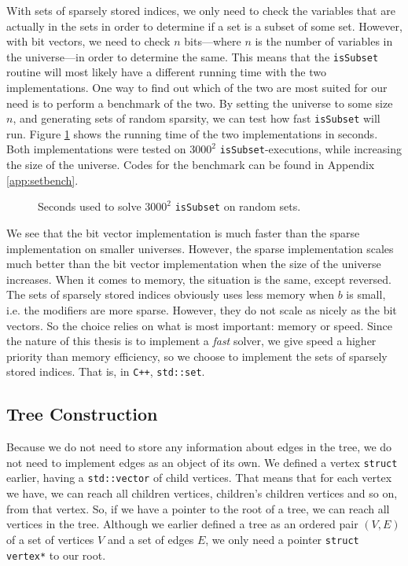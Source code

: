 With sets of sparsely stored indices, we only need to check the variables
that are actually in the sets in order to determine if a set is a subset
of some set. However, with bit vectors, we need to check $n$ bits---where $n$
is the number of variables in the universe---in order to determine the same.
This means that the \texttt{isSubset} routine will most likely have a different
running time with the two implementations. One way to find out which of the two
are most suited for our need is to perform a benchmark of the two. By
setting the universe to some size $n$, and generating sets of random sparsity,
we can test how fast \texttt{isSubset} will run. Figure \ref{fig:setspeed}
shows the running time of the two implementations in seconds. Both
implementations were tested on $3000^2$ \texttt{isSubset}-executions, while
increasing the size of the universe.
Codes for the benchmark can be found in Appendix \ref{app:setbench}.
\begin{figure}[h!]
\begin{center}

\end{center}
\caption{Seconds used to solve $3000^2$ \texttt{isSubset} on random sets.}
\label{fig:setspeed}
\end{figure}
We see that the bit vector implementation is much faster than the sparse
implementation on smaller universes. However, the sparse implementation
scales much better than the bit vector implementation when the size of
the universe increases. When it comes to memory, the situation is the same,
except reversed. The sets of sparsely stored indices obviously uses less
memory when $b$ is small, i.e. the modifiers are more sparse. However, they
do not scale as nicely as the bit vectors. So the choice relies on what is
most important: memory or speed. Since the nature of this thesis is to
implement a \emph{fast} solver, we give speed a higher priority than memory 
efficiency, so we choose to implement the sets of sparsely stored
indices. That is, in \texttt{C++}, \texttt{std::set}.

\subsection{Tree Construction}
Because we do not need to store any information about edges in the tree,
we do not need to implement edges as an object of its own. We defined
a vertex \texttt{struct} earlier, having a \texttt{std::vector} of child
vertices. That means that for each vertex we have, we can reach all children
vertices, children's children vertices and so on, from that vertex.
So, if we have a pointer to the root of a tree, we can reach all vertices
in the tree. Although we earlier defined a tree as an ordered pair
$(V, E)$ of a set of vertices $V$ and a set of edges $E$, we only need a
pointer \texttt{struct vertex*} to our root.

